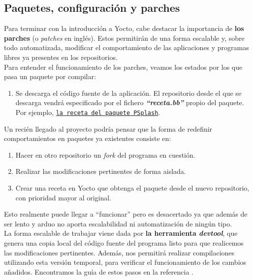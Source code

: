 \subsection{Paquetes, configuración y parches}

Para terminar con la introducción a Yocto, cabe destacar la importancia de \textbf{los parches} (o \textit{patches} en inglés). Estos permitirán de una forma escalable y, sobre todo automatizada, modificar el comportamiento de las aplicaciones y programas libres ya presentes en los repositorios.\\

Para entender el funcionamiento de los parches, veamos los estados por los que pasa un paquete por compilar:

\begin{enumerate}
	\item Se descarga el código fuente de la aplicación. El repositorio desde el que se descarga vendrá especificado por el fichero \textbf{\textit{``receta.bb''}} propio del paquete. Por ejemplo, \href{http://cgit.openembedded.org/openembedded-core/tree/meta/recipes-core/psplash/psplash_git.bb?h=master}{\texttt{la receta del paquete PSplash}}.
\end{enumerate}

Un recién llegado al proyecto podría pensar que la forma de redefinir comportamientos en paquetes ya existentes consiste en:

\begin{enumerate}
	\item Hacer en otro repositorio un \textit{fork} del programa en cuestión.
	\item Realizar las modificaciones pertinentes de forma aislada.
	\item Crear una receta en Yocto que obtenga el paquete desde el nuevo repositorio, con prioridad mayor al original.
\end{enumerate}

Esto realmente puede llegar a ``funcionar'' pero es desacertado ya que además de ser lento y arduo no aporta escalabilidad ni automatización de ningún tipo.\\

La forma escalable de trabajar viene dada por \textbf{la herramienta \textit{devtool}}, que genera una copia local del código fuente del programa listo para que realicemos las modificaciones pertinentes. Además, nos permitirá realizar compilaciones utilizando esta versión temporal, para verificar el funcionamiento de los cambios añadidos. Encontramos la guía de estos pasos en la referencia \cite{wiki-yocto-patches}.\\

